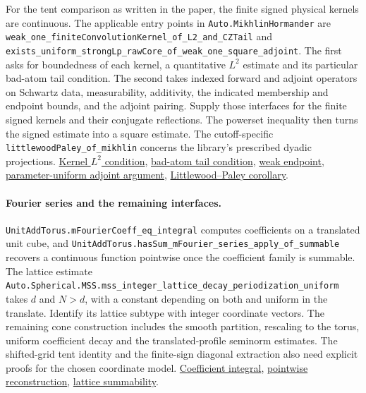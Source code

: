 \documentclass[11pt,letterpaper]{article}
\theoremstyle{definition}
\begin{document}
For the tent comparison as written in the paper, the finite signed physical kernels are continuous. The applicable entry points in \nolinkurl{Auto.MikhlinHormander} are \nolinkurl{weak_one_finiteConvolutionKernel_of_L2_and_CZTail} and \nolinkurl{exists_uniform_strongLp_rawCore_of_weak_one_square_adjoint}. The first asks for boundedness of each kernel, a quantitative \(L^2\) estimate and its particular bad-atom tail condition. The second takes indexed forward and adjoint operators on Schwartz data, measurability, additivity, the indicated membership and endpoint bounds, and the adjoint pairing. Supply those interfaces for the finite signed kernels and their conjugate reflections. The powerset inequality then turns the signed estimate into a square estimate. The cutoff-specific \nolinkurl{littlewoodPaley_of_mikhlin} concerns the library's prescribed dyadic projections. \href{https://github.com/roos-j/lean-spherical/blob/800b71afca91e42809c21e6e2fd9ae4f82467082/LeanSpherical/Auto/CalderonZygmund.lean#L144}{Kernel \(L^2\) condition}, \href{https://github.com/roos-j/lean-spherical/blob/800b71afca91e42809c21e6e2fd9ae4f82467082/LeanSpherical/Auto/CalderonZygmund.lean#L504}{bad-atom tail condition}, \href{https://github.com/roos-j/lean-spherical/blob/800b71afca91e42809c21e6e2fd9ae4f82467082/LeanSpherical/Auto/CalderonZygmund.lean#L4016}{weak endpoint}, \href{https://github.com/roos-j/lean-spherical/blob/800b71afca91e42809c21e6e2fd9ae4f82467082/LeanSpherical/Auto/CalderonZygmund.lean#L4881}{parameter-uniform adjoint argument}, \href{https://github.com/roos-j/lean-spherical/blob/800b71afca91e42809c21e6e2fd9ae4f82467082/LeanSpherical/Auto/CalderonZygmund.lean#L5228}{Littlewood--Paley corollary}.

\paragraph{Fourier series and the remaining interfaces.}
\nolinkurl{UnitAddTorus.mFourierCoeff_eq_integral} computes coefficients on a translated unit cube, and \nolinkurl{UnitAddTorus.hasSum_mFourier_series_apply_of_summable} recovers a continuous function pointwise once the coefficient family is summable. The lattice estimate \nolinkurl{Auto.Spherical.MSS.mss_integer_lattice_decay_periodization_uniform} takes \(d\) and \(N>d\), with a constant depending on both and uniform in the translate. Identify its lattice subtype with integer coordinate vectors. The remaining cone construction includes the smooth partition, rescaling to the torus, uniform coefficient decay and the translated-profile seminorm estimates. The shifted-grid tent identity and the finite-sign diagonal extraction also need explicit proofs for the chosen coordinate model. \href{https://github.com/leanprover-community/mathlib4/blob/c55e6e786f49471c72fbddbec5415808896aec1e/Mathlib/Analysis/Fourier/AddCircleMulti.lean#L251}{Coefficient integral}, \href{https://github.com/leanprover-community/mathlib4/blob/c55e6e786f49471c72fbddbec5415808896aec1e/Mathlib/Analysis/Fourier/AddCircleMulti.lean#L329}{pointwise reconstruction}, \href{https://github.com/roos-j/lean-spherical/blob/800b71afca91e42809c21e6e2fd9ae4f82467082/LeanSpherical/Auto/Spherical/MSS/FourierCubeLattice.lean#L1311}{lattice summability}.
\end{document}
